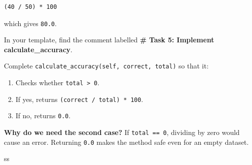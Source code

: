 \begin{verbatim}
(40 / 50) * 100
\end{verbatim}

\noindent
which gives \texttt{80.0}.

\medskip
\noindent
In your template, find the comment labelled \textbf{\# Task 5: Implement calculate\_accuracy}.


Complete \texttt{calculate\_accuracy(self, correct, total)} so that it:
\begin{enumerate}
    \item Checks whether \texttt{total > 0}.
    \item If yes, returns \texttt{(correct / total) * 100}.
    \item If no, returns \texttt{0.0}.
\end{enumerate}

\medskip
\noindent
\textbf{Why do we need the second case?}
If \texttt{total == 0}, dividing by zero would cause an error.
Returning \texttt{0.0} makes the method safe even for an empty dataset.
\begin{tcolorbox}[title=Task 5: Implement calculate\_accuracy]
ss
\end{tcolorbox}

